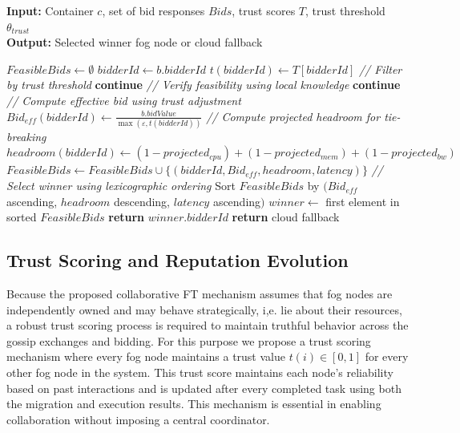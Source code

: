 \documentclass{article}
\begin{document}
\begin{algorithm}[t]
\caption{Bid Evaluation and Winner Selection at Origin Fog Node}
\label{alg:bid_selection}
 \textbf{Input:} Container $c$, set of bid responses $Bids$, trust scores $T$, trust threshold $\theta_{trust}$ \\
 \textbf{Output:} Selected winner fog node or cloud fallback
\begin{algorithmic}[1]
\State $FeasibleBids \gets \emptyset$
    \State $bidderId \gets b.bidderId$
    \State $t(bidderId) \gets T[bidderId]$
    \State
    \State \textit{// Filter by trust threshold}
        \State \textbf{continue} 
    \EndIf
    \State
    \State \textit{// Verify feasibility using local knowledge}
        \State \textbf{continue}
    \EndIf
    \State
    \State \textit{// Compute effective bid using trust adjustment}
    \State $Bid_{eff}(bidderId) \gets \frac{b.bidValue}{\max(\varepsilon, t(bidderId))}$ 
    \State
    \State \textit{// Compute projected headroom for tie-breaking}
    \State $headroom(bidderId) \gets (1 - projected_{cpu}) + (1 - projected_{mem}) + (1 - projected_{bw})$
    \State
    \State $FeasibleBids \gets FeasibleBids \cup \{(bidderId, Bid_{eff}, headroom, latency)\}$
\EndFor
\State
\State \textit{// Select winner using lexicographic ordering}
    \State Sort $FeasibleBids$ by $(Bid_{eff}$ ascending, $headroom$ descending, $latency$ ascending$)$
    \State $winner \gets$ first element in sorted $FeasibleBids$
    \State \textbf{return} $winner.bidderId$
\Else
    \State \textbf{return} cloud fallback
\EndIf
\end{algorithmic}
\end{algorithm}


\subsection{Trust Scoring and Reputation Evolution}

Because the proposed collaborative FT mechanism assumes that fog nodes are independently owned and may behave strategically, i,e. lie about their resources, a robust trust scoring process is required to maintain truthful behavior across the gossip exchanges and bidding. For this purpose we propose a trust scoring mechanism where every fog node maintains a trust value \(t(i)\in [0,1]\) for every other fog node in the system. This trust score maintains each node’s reliability based on past interactions and is updated after every completed task using both the migration and execution results. This mechanism is essential in enabling collaboration without imposing a central coordinator.
\end{document}
